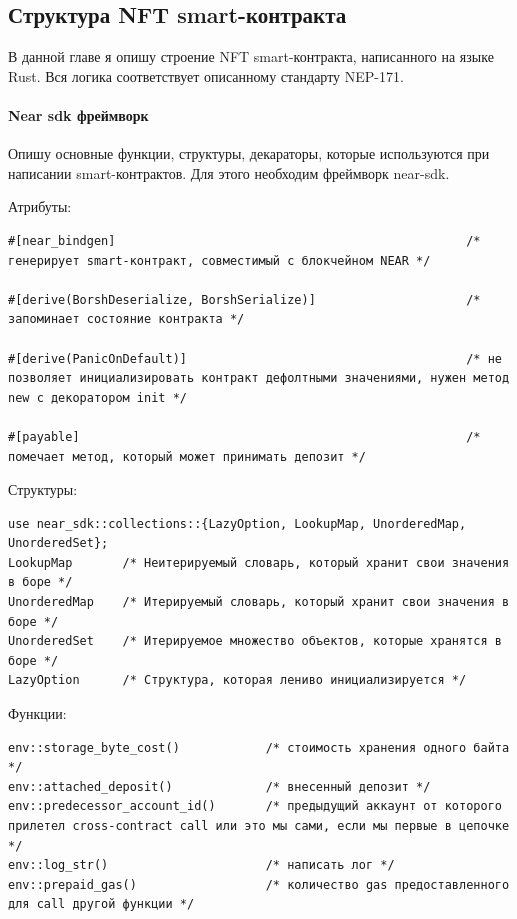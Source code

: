 \subsection{Структура NFT smart-контракта}
В данной главе я опишу строение NFT smart-контракта, написанного на языке Rust. Вся логика соответствует описанному стандарту NEP-171\cite{nftstandart}.
\paragraph{Near sdk фреймворк}
Опишу основные функции, структуры, декараторы, которые используются при написании smart-контрактов. Для этого необходим фреймворк near-sdk\cite{nearsdkrs}.

Атрибуты:
\begin{verbatim}
#[near_bindgen]                                                 /* генерирует smart-контракт, совместимый с блокчейном NEAR */

#[derive(BorshDeserialize, BorshSerialize)]                     /* запоминает состояние контракта */

#[derive(PanicOnDefault)]                                       /* не позволяет инициализировать контракт дефолтными значениями, нужен метод new с декоратором init */

#[payable]                                                      /* помечает метод, который может принимать депозит */
\end{verbatim}

Структуры:

\begin{verbatim}
use near_sdk::collections::{LazyOption, LookupMap, UnorderedMap, UnorderedSet};
LookupMap       /* Неитерируемый словарь, который хранит свои значения в боре */
UnorderedMap    /* Итерируемый словарь, который хранит свои значения в боре */
UnorderedSet    /* Итерируемое множество объектов, которые хранятся в боре */
LazyOption      /* Структура, которая лениво инициализируется */
\end{verbatim}

Функции:
\begin{verbatim}
env::storage_byte_cost()            /* стоимость хранения одного байта */
env::attached_deposit()             /* внесенный депозит */
env::predecessor_account_id()       /* предыдущий аккаунт от которого прилетел cross-contract call или это мы сами, если мы первые в цепочке */
env::log_str()                      /* написать лог */
env::prepaid_gas()                  /* количество gas предоставленного для call другой функции */
\end{verbatim}

